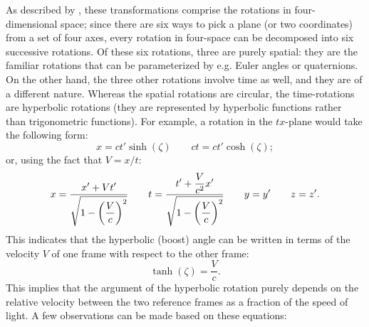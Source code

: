 As described by \citet{Landau1971}, these transformations comprise the rotations in four-dimensional space; since there are six ways to pick a plane (or two coordinates) from a set of four axes, every rotation in four-space can be decomposed into six successive rotations. Of these six rotations, three are purely spatial: they are the familiar rotations that can be parameterized by e.g. Euler angles or quaternions. On the other hand, the three other rotations involve time as well, and they are of a different nature. Whereas the spatial rotations are circular, the time-rotations are hyperbolic rotations (they are represented by hyperbolic functions rather than trigonometric functions). For example, a rotation in the \(tx\)-plane would take the following form:
\begin{equation}
    x = ct'\sinh(\zeta)\qquad ct = ct'\cosh(\zeta);
    \label{eq:lorentz_transform_hyp}
\end{equation}
or, using the fact that \(V = x/t\):
\begin{equation}
    x = \frac{\displaystyle x' + Vt'}{\displaystyle \sqrt{1 - \qty(\frac{V}{c})^2}} 
    \qquad t = \frac{\displaystyle t' + \frac{V}{c^2}x'}{\displaystyle \sqrt{1 - \qty(\frac{V}{c})^2}} \qquad y = y' \qquad z = z'.
    \label{eq:lorentz_transform_sqrt}
\end{equation}
This indicates that the hyperbolic (boost) angle  can be written in terms of the velocity \(V\) of one frame with respect to the other frame:
\[ \tanh(\zeta) = \frac{V}{c}.\]
This implies that the argument of the hyperbolic rotation purely depends on the relative velocity between the two reference frames as a fraction of the speed of light. A few observations can be made based on these equations: 
